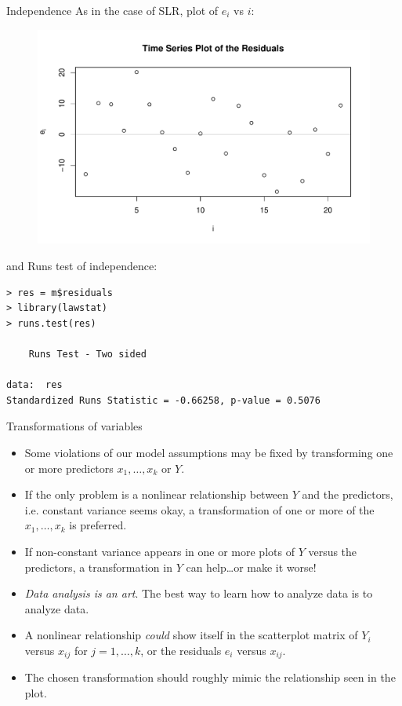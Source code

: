 \documentclass{beamer}
\begin{document}
\begin{frame}[fragile]{Independence}
As in the case of SLR, plot of $e_i$ vs $i$:
\begin{figure}
    \centering
    \includegraphics[width=.5\textwidth]{plots/res_ts.pdf}
\end{figure}

\pause and Runs test of independence:
\begin{footnotesize}
\begin{verbatim}
> res = m$residuals
> library(lawstat)
> runs.test(res)

	Runs Test - Two sided

data:  res
Standardized Runs Statistic = -0.66258, p-value = 0.5076
\end{verbatim}
\end{footnotesize}
\end{frame}

\begin{frame}{Transformations of variables}
\begin{itemize}
\item Some violations of our model assumptions may be fixed by
transforming one or more predictors $x_1,\ldots,x_k$ or $Y$.
\item<2-> If the only problem is a nonlinear relationship between $Y$ and
the predictors, i.e. constant variance seems okay, a transformation of one or more of the $x_1, \ldots, x_k$ is preferred.
\item<3-> If non-constant variance appears in one or more plots of $Y$ versus the predictors, a transformation in $Y$ can help\ldots or make it worse!
\item<4-> \textit{Data analysis is an art}. The best way to learn how to analyze
data is to analyze data.
\item<5-> A nonlinear relationship \textit{could} show itself in the scatterplot matrix of $Y_i$ versus $x_{ij}$ for $j = 1, \ldots, k$, or the residuals $e_i$ versus $x_{ij}$.
\item<6-> The chosen transformation should roughly mimic the relationship seen in the plot.
\end{itemize}
\end{frame}
\end{document}
